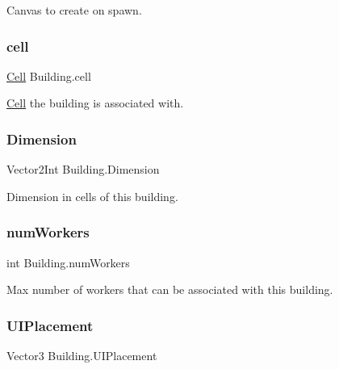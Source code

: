 Canvas to create on spawn. 

\mbox{\label{class_building_ae4542c15fe24dd9499c72b16cb329492}} 
\subsubsection{\texorpdfstring{cell}{cell}}
{\footnotesize\ttfamily \mbox{\hyperlink{class_cell}{Cell}} Building.\+cell\hspace{0.3cm}{\ttfamily [protected]}}



\mbox{\hyperlink{class_cell}{Cell}} the building is associated with. 

\mbox{\label{class_building_a5fce85810caa468c10e4c13f6ae0d7f2}} 
\subsubsection{\texorpdfstring{Dimension}{Dimension}}
{\footnotesize\ttfamily Vector2\+Int Building.\+Dimension\hspace{0.3cm}{\ttfamily [protected]}}



Dimension in cells of this building. 

\mbox{\label{class_building_aaa4b2181ae88464dd858258051460807}} 
\subsubsection{\texorpdfstring{num\+Workers}{numWorkers}}
{\footnotesize\ttfamily int Building.\+num\+Workers\hspace{0.3cm}{\ttfamily [protected]}}



Max number of workers that can be associated with this building. 

\mbox{\label{class_building_a694eaef4268e25024f43389db9527dde}} 
\subsubsection{\texorpdfstring{U\+I\+Placement}{UIPlacement}}
{\footnotesize\ttfamily Vector3 Building.\+U\+I\+Placement\hspace{0.3cm}{\ttfamily [protected]}}



